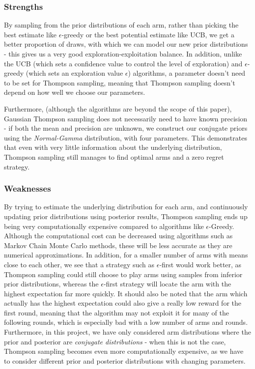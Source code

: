 \subsubsection{Strengths}
By sampling from the prior distributions of each arm, rather than picking the best estimate like $\epsilon$-greedy or the best potential estimate like UCB, we get a better proportion of draws, with which we can model our new prior distributions - this gives us a very good exploration-exploitation balance. In addition, unlike the UCB (which sets a confidence value to control the level of exploration) and $\epsilon$-greedy (which sets an exploration value $\epsilon$) algorithms, a parameter doesn't need to be set for Thompson sampling, meaning that Thompson sampling doesn't depend on how well we choose our parameters. 

Furthermore, (although the algorithms are beyond the scope of this paper), Gaussian Thompson sampling does not necessarily need to have known precision - if both the mean and precision are unknown, we construct our conjugate priors using the \emph{Normal-Gamma} distribution, with four parameters. This demonstrates that even with very little information about the underlying distribution, Thompson sampling still manages to find optimal arms and a zero regret strategy. 

\subsubsection{Weaknesses}
By trying to estimate the underlying distribution for each arm, and continuously updating prior distributions using posterior results, Thompson sampling ends up being very computationally expensive compared to algorithms like $\epsilon$-Greedy. \citep{mazumdar2020thompson} Although the computational cost can be decreased using algorithms such as Markov Chain Monte Carlo methods, these will be less accurate as they are numerical approximations. \citep{mazumdar2020thompson} In addition, for a smaller number of arms with means close to each other, we see that a strategy such as $\epsilon$-first would work better, as Thompson sampling could still choose to play arms using samples from inferior prior distributions, whereas the $\epsilon$-first strategy will locate the arm with the highest expectation far more quickly. It should also be noted that the arm which actually has the highest expectation could also give a really low reward for the first round, meaning that the algorithm may not exploit it for many of the following rounds, which is especially bad with a low number of arms and rounds. Furthermore, in this project, we have only considered arm distributions where the prior and posterior are \emph{conjugate distributions} - when this is not the case, Thompson sampling becomes even more computationally expensive, as we have to consider different prior and posterior distributions with changing parameters.

